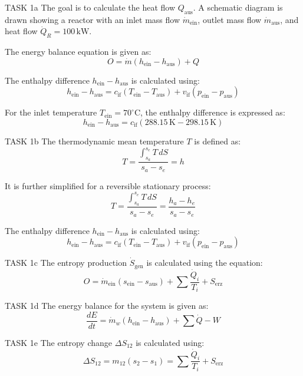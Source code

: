 TASK 1a  
The goal is to calculate the heat flow \( Q_{\text{aus}} \). A schematic diagram is drawn showing a reactor with an inlet mass flow \( \dot{m}_{\text{ein}} \), outlet mass flow \( \dot{m}_{\text{aus}} \), and heat flow \( \dot{Q}_R = 100 \, \text{kW} \).  

The energy balance equation is given as:  
\[
O = \dot{m} (h_{\text{ein}} - h_{\text{aus}}) + Q
\]  

The enthalpy difference \( h_{\text{ein}} - h_{\text{aus}} \) is calculated using:  
\[
h_{\text{ein}} - h_{\text{aus}} = c_{\text{if}} (T_{\text{ein}} - T_{\text{aus}}) + v_{\text{if}} (p_{\text{ein}} - p_{\text{aus}})
\]  

For the inlet temperature \( T_{\text{ein}} = 70^\circ\text{C} \), the enthalpy difference is expressed as:  
\[
h_{\text{ein}} - h_{\text{aus}} = c_{\text{if}} (288.15 \, \text{K} - 298.15 \, \text{K})
\]  

TASK 1b  
The thermodynamic mean temperature \( T \) is defined as:  
\[
T = \frac{\int_{s_a}^{s_e} T \, dS}{s_a - s_e} = h
\]  

It is further simplified for a reversible stationary process:  
\[
T = \frac{\int_{s_a}^{s_e} T \, dS}{s_a - s_e} = \frac{h_a - h_e}{s_a - s_e}
\]  

The enthalpy difference \( h_{\text{ein}} - h_{\text{aus}} \) is calculated using:  
\[
h_{\text{ein}} - h_{\text{aus}} = c_{\text{if}} (T_{\text{ein}} - T_{\text{aus}}) + v_{\text{if}} (p_{\text{ein}} - p_{\text{aus}})
\]  

TASK 1c  
The entropy production \( \dot{S}_{\text{gen}} \) is calculated using the equation:  
\[
O = \dot{m}_{\text{ein}} (s_{\text{ein}} - s_{\text{aus}}) + \sum \frac{\dot{Q}_i}{T_i} + S_{\text{erz}}
\]  

TASK 1d  
The energy balance for the system is given as:  
\[
\frac{dE}{dt} = \dot{m}_w (h_{\text{ein}} - h_{\text{aus}}) + \sum \dot{Q} - W
\]  

TASK 1e  
The entropy change \( \Delta S_{12} \) is calculated using:  
\[
\Delta S_{12} = m_{12} (s_2 - s_1) = \sum \frac{\dot{Q}_i}{T_i} + S_{\text{erz}}
\]  